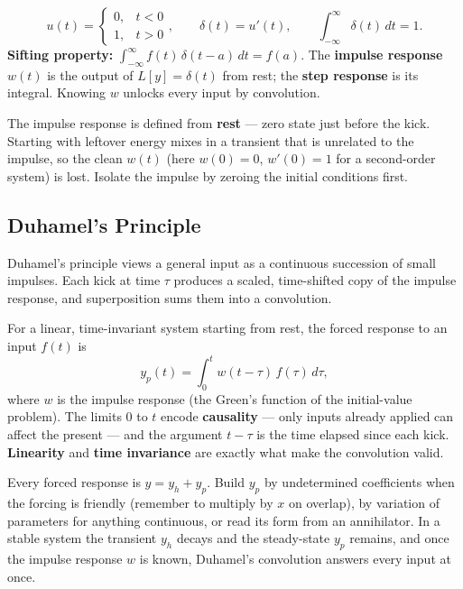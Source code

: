 \begin{formulabox}
\[ u(t) = \begin{cases} 0, & t<0 \\ 1, & t>0 \end{cases}, \qquad
   \delta(t) = u'(t), \qquad \int_{-\infty}^{\infty}\!\delta(t)\,dt = 1. \]
\textbf{Sifting property:} $\displaystyle\int_{-\infty}^{\infty} f(t)\,\delta(t-a)\,dt = f(a)$.
The \textbf{impulse response} $w(t)$ is the output of $L[y]=\delta(t)$ from rest;
the \textbf{step response} is its integral. Knowing $w$ unlocks every input by
convolution.
\end{formulabox}

\begin{warningbox}
The impulse response is defined from \textbf{rest} --- zero state just before the
kick. Starting with leftover energy mixes in a transient that is unrelated to the
impulse, so the clean $w(t)$ (here $w(0)=0$, $w'(0)=1$ for a second-order system)
is lost. Isolate the impulse by zeroing the initial conditions first.
\end{warningbox}

\subsection{Duhamel's Principle}

Duhamel's principle views a general input as a continuous succession of small
impulses. Each kick at time $\tau$ produces a scaled, time-shifted copy of the
impulse response, and superposition sums them into a convolution.

\begin{methodbox}
For a linear, time-invariant system starting from rest, the forced response to an
input $f(t)$ is
\[ y_p(t) = \int_0^t w(t-\tau)\,f(\tau)\,d\tau, \]
where $w$ is the impulse response (the Green's function of the initial-value
problem). The limits $0$ to $t$ encode \textbf{causality} --- only inputs already
applied can affect the present --- and the argument $t-\tau$ is the time elapsed
since each kick. \textbf{Linearity} and \textbf{time invariance} are exactly what
make the convolution valid.
\end{methodbox}

\begin{conceptbox}
Every forced response is \textcolor{accentorange}{$y = y_h + y_p$}. Build $y_p$ by
\textcolor{accentorange}{undetermined coefficients} when the forcing is friendly
(remember to \textcolor{accentorange}{multiply by $x$} on overlap), by
\textcolor{accentorange}{variation of parameters} for anything continuous, or read
its form from an \textcolor{accentorange}{annihilator}. In a stable system the
\textcolor{accentorange}{transient} $y_h$ decays and the
\textcolor{accentorange}{steady-state} $y_p$ remains, and once the
\textcolor{accentorange}{impulse response $w$} is known,
\textcolor{accentorange}{Duhamel's convolution} answers every input at once.
\end{conceptbox}

